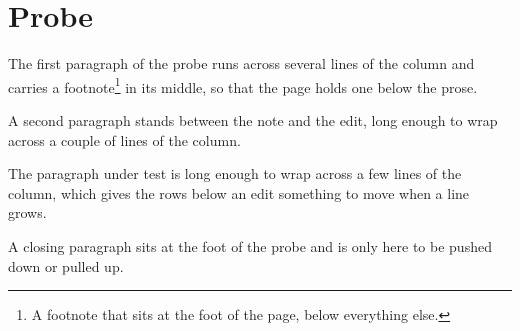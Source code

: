 \documentclass{article}
\begin{document}
\section{Probe}
The first paragraph of the probe runs across several lines of the column and carries a footnote\footnote{A footnote that sits at the foot of the page, below everything else.} in its middle, so that the page holds one below the prose.

A second paragraph stands between the note and the edit, long enough to wrap across a couple of lines of the column.

The paragraph under test is long enough to wrap across a few lines of the column, which gives the rows below an edit something to move when a line grows.

A closing paragraph sits at the foot of the probe and is only here to be pushed down or pulled up.
\end{document}

